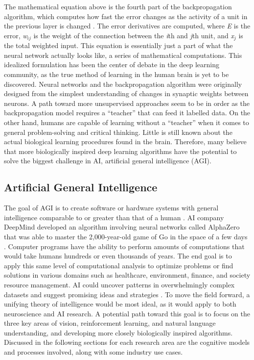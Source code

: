 \documentclass[12pt]{article}
\begin{document}
The mathematical equation above is the fourth part of the backpropagation algorithm, which computes how fast the error changes as the activity of a unit in the previous layer is changed \cite{c8}. The error derivatives are computed, where \emph{E} is the error, \emph{w$_{ij}$} is the weight of the connection between the \emph{i}th and \emph{j}th unit, and \emph{x$_j$} is the total weighted input. This equation is essentially just a part of what the neural network actually looks like, a series of mathematical computations. This idealized formulation has been the center of debate in the deep learning community, as the true method of learning in the human brain is yet to be discovered. Neural networks and the backpropagation algorithm were originally designed from the simplest understanding of changes in synaptic weights between neurons. A path toward more unsupervised approaches seem to be in order as the backpropagation model requires a ``teacher'' that can feed it labelled data. On the other hand, humans are capable of learning without a ``teacher'' when it comes to general problem-solving and critical thinking. Little is still known about the actual biological learning procedures found in the brain. Therefore, many believe that more biologically inspired deep learning algorithms have the potential to solve the biggest challenge in AI, artificial general intelligence (AGI).

\subsection{Artificial General Intelligence}
The goal of AGI is to create software or hardware systems with general intelligence comparable to or greater than that of a human \cite{c2}. AI company DeepMind developed an algorithm involving neural networks called AlphaZero that was able to master the 2,000-year-old game of Go in the space of a few days \cite{c4}. Computer programs have the ability to perform amounts of computations that would take humans hundreds or even thousands of years. The end goal is to apply this same level of computational analysis to optimize problems or find solutions in various domains such as healthcare, environment, finance, and society resource management. AI could uncover patterns in overwhelmingly complex datasets and suggest promising ideas and strategies \cite{c12}. To move the field forward, a unifying theory of intelligence would be most ideal, as it would apply to both neuroscience and AI research. A potential path toward this goal is to focus on the three key areas of vision, reinforcement learning, and natural language understanding, and developing more closely biologically inspired algorithms. Discussed in the following sections for each research area are the cognitive models and processes involved, along with some industry use cases.  
\end{document}
